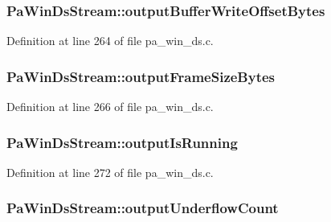 \subsubsection[{\texorpdfstring{output\+Buffer\+Write\+Offset\+Bytes}{outputBufferWriteOffsetBytes}}]{ Pa\+Win\+Ds\+Stream\+::output\+Buffer\+Write\+Offset\+Bytes}\hypertarget{struct_pa_win_ds_stream_aba0e8e56c34492d73283950d0dac83e9}{}\label{struct_pa_win_ds_stream_aba0e8e56c34492d73283950d0dac83e9}


Definition at line 264 of file pa\+\_\+win\+\_\+ds.\+c.

\subsubsection[{\texorpdfstring{output\+Frame\+Size\+Bytes}{outputFrameSizeBytes}}]{ Pa\+Win\+Ds\+Stream\+::output\+Frame\+Size\+Bytes}\hypertarget{struct_pa_win_ds_stream_a6259cccdde91a75238760247fde2406b}{}\label{struct_pa_win_ds_stream_a6259cccdde91a75238760247fde2406b}


Definition at line 266 of file pa\+\_\+win\+\_\+ds.\+c.

\subsubsection[{\texorpdfstring{output\+Is\+Running}{outputIsRunning}}]{ Pa\+Win\+Ds\+Stream\+::output\+Is\+Running}\hypertarget{struct_pa_win_ds_stream_a23d5ebcba24ed4cc170f141d8f03ff48}{}\label{struct_pa_win_ds_stream_a23d5ebcba24ed4cc170f141d8f03ff48}


Definition at line 272 of file pa\+\_\+win\+\_\+ds.\+c.

\subsubsection[{\texorpdfstring{output\+Underflow\+Count}{outputUnderflowCount}}]{ Pa\+Win\+Ds\+Stream\+::output\+Underflow\+Count}\hypertarget{struct_pa_win_ds_stream_a6caeecd8ba926e6afa3b66575dab748a}{}\label{struct_pa_win_ds_stream_a6caeecd8ba926e6afa3b66575dab748a}


